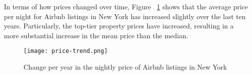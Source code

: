 
In terms of how prices changed over time, Figure
~\ref{fig:prices-change-by-years} shows that the average price per night for
Airbnb listings in New York has increased slightly over the
last ten years. Particularly, the top-tier property prices have increased,
resulting in a more substantial increase in the mean price than the median.


\begin{figure}[!htbp] \centering
    \texttt{[image: price-trend.png]}
    \caption{Change per year in the nightly price of Airbnb listings in New York}
    \label{fig:prices-change-by-years}
\end{figure}


